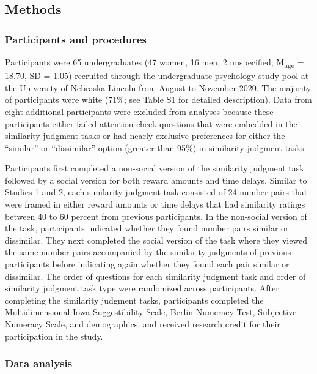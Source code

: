 \documentclass[
  pub,floatsintext]{apa6}
\begin{document}
\hypertarget{methods-2}{%
\subsection{Methods}\label{methods-2}}

\hypertarget{participants-and-procedures-2}{%
\subsubsection{Participants and procedures}\label{participants-and-procedures-2}}

Participants were 65 undergraduates (47 women, 16 men, 2 unspecified; M\textsubscript{age} = 18.70, SD = 1.05) recruited through the undergraduate psychology study pool at the University of Nebraska-Lincoln from August to November 2020. The majority of participants were white (71\%; see Table S1 for detailed description). Data from eight additional participants were excluded from analyses because these participants either failed attention check questions that were embedded in the similarity judgment tasks or had nearly exclusive preferences for either the ``similar'' or ``dissimilar'' option (greater than 95\%) in similarity judgment tasks.

Participants first completed a non-social version of the similarity judgment task followed by a social version for both reward amounts and time delays. Similar to Studies 1 and 2, each similarity judgment task consisted of 24 number pairs that were framed in either reward amounts or time delays that had similarity ratings between 40 to 60 percent from previous participants. In the non-social version of the task, participants indicated whether they found number pairs similar or dissimilar. They next completed the social version of the task where they viewed the same number pairs accompanied by the similarity judgments of previous participants before indicating again whether they found each pair similar or dissimilar. The order of questions for each similarity judgment task and order of similarity judgment task type were randomized across participants. After completing the similarity judgment tasks, participants completed the Multidimensional Iowa Suggestibility Scale, Berlin Numeracy Test, Subjective Numeracy Scale, and demographics, and received research credit for their participation in the study.

\hypertarget{data-analysis-2}{%
\subsubsection{Data analysis}\label{data-analysis-2}}
\end{document}
